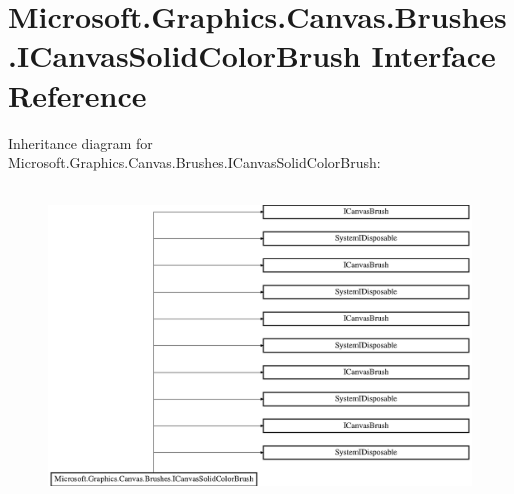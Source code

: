 \hypertarget{interface_microsoft_1_1_graphics_1_1_canvas_1_1_brushes_1_1_i_canvas_solid_color_brush}{}\section{Microsoft.\+Graphics.\+Canvas.\+Brushes.\+I\+Canvas\+Solid\+Color\+Brush Interface Reference}
\label{interface_microsoft_1_1_graphics_1_1_canvas_1_1_brushes_1_1_i_canvas_solid_color_brush}
Inheritance diagram for Microsoft.\+Graphics.\+Canvas.\+Brushes.\+I\+Canvas\+Solid\+Color\+Brush\+:\begin{figure}[H]
\begin{center}
\leavevmode
\includegraphics[height=8.392370cm]{interface_microsoft_1_1_graphics_1_1_canvas_1_1_brushes_1_1_i_canvas_solid_color_brush}
\end{center}
\end{figure}
